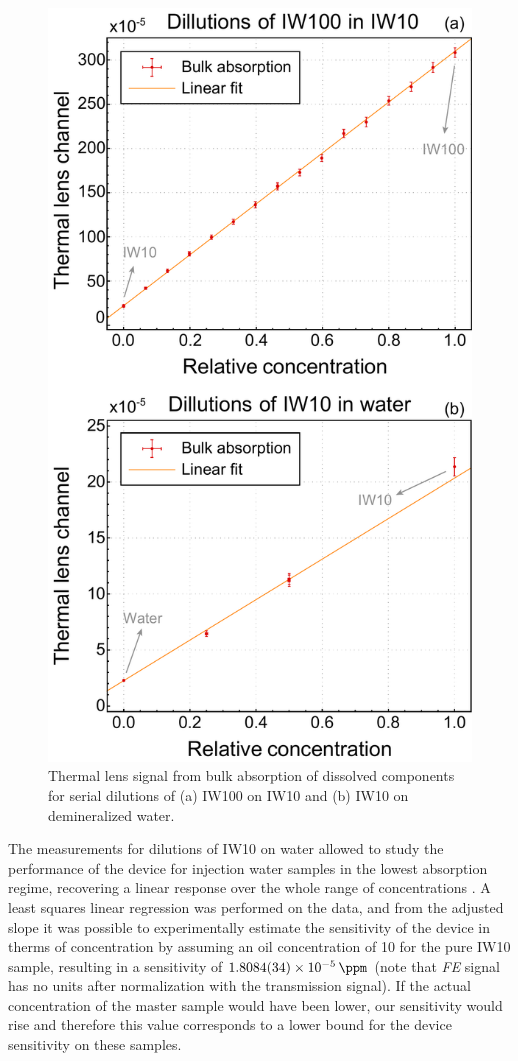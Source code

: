 \documentclass[10pt,authoryear,twocolumn]{article}
\newcommand{\FE}{\textit{FE}}
\begin{document}
\begin{figure}[t!]
	\centering \includegraphics[width=.49\textwidth]{Figuras/IWvsC.pdf}
	\caption{Thermal lens signal from bulk absorption of dissolved components for serial dilutions of (a) IW100 on IW10 and (b) IW10 on demineralized water.}
	\label{fig:BulkAbsorption}
\end{figure}

The measurements for dilutions of IW10 on water allowed to study the performance of the device for injection water samples in the lowest absorption regime, recovering a linear response over the whole range of concentrations%
. A least squares linear regression was performed on the data, and from the adjusted slope it was possible to experimentally estimate the sensitivity of the device in therms of concentration by assuming an oil concentration of \SI{10}{\ppm} for the pure IW10 sample, resulting in a sensitivity of $\SI{1.8084(34)d-5}{\per\ppm}$ (note that \FE{} signal has no units after normalization with the transmission signal). If the actual concentration of the master sample would have been lower, our sensitivity would rise and therefore this value corresponds to a lower bound for the device sensitivity on these samples.
\end{document}
